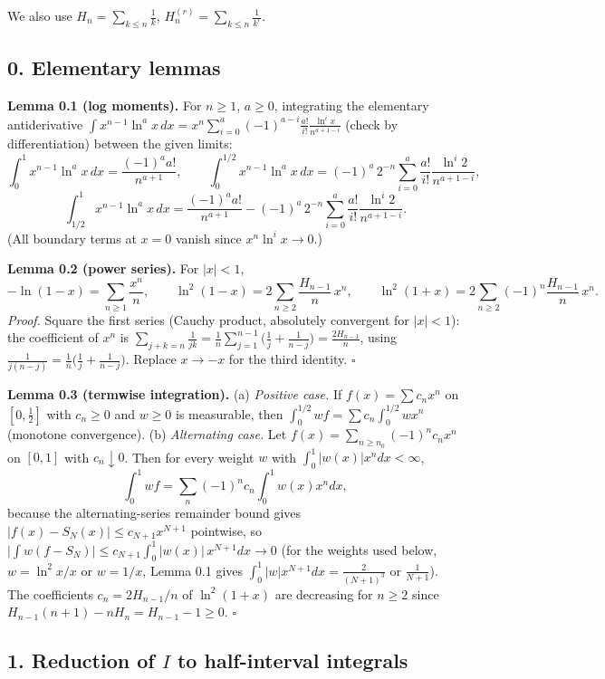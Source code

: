\documentclass[11pt]{article}
\theoremstyle{remark}
\begin{document}
We also use $H_n=\sum_{k\le n}\frac1k$, $H_n^{(r)}=\sum_{k\le n}\frac1{k^r}$.

\subsection*{0. Elementary lemmas}

\textbf{Lemma 0.1 (log moments).} For $n\ge1$, $a\ge0$, integrating the elementary antiderivative
$\int x^{n-1}\ln^a x\,dx=x^{n}\sum_{i=0}^{a}(-1)^{a-i}\frac{a!}{i!}\frac{\ln^i x}{n^{a+1-i}}$ (check by
differentiation) between the given limits:
\[
\int_0^1 x^{n-1}\ln^a x\,dx=\frac{(-1)^a a!}{n^{a+1}},\qquad
\int_0^{1/2}x^{n-1}\ln^a x\,dx=(-1)^a\,2^{-n}\sum_{i=0}^{a}\frac{a!}{i!}\frac{\ln^i 2}{n^{a+1-i}},
\]
\[
\int_{1/2}^{1}x^{n-1}\ln^a x\,dx=\frac{(-1)^a a!}{n^{a+1}}
-(-1)^a\,2^{-n}\sum_{i=0}^{a}\frac{a!}{i!}\frac{\ln^i 2}{n^{a+1-i}} .
\]
(All boundary terms at $x=0$ vanish since $x^n\ln^ix\to0$.)

\textbf{Lemma 0.2 (power series).} For $|x|<1$,
\[
-\ln(1-x)=\sum_{n\ge1}\frac{x^n}{n},\qquad
\ln^2(1-x)=2\sum_{n\ge2}\frac{H_{n-1}}{n}\,x^{n},\qquad
\ln^2(1+x)=2\sum_{n\ge2}(-1)^n\frac{H_{n-1}}{n}\,x^{n}.
\]
\textit{Proof.} Square the first series (Cauchy product, absolutely convergent for $|x|<1$):
the coefficient of $x^n$ is $\sum_{j+k=n}\frac{1}{jk}=\frac1n\sum_{j=1}^{n-1}\Big(\frac1j+\frac1{n-j}\Big)
=\frac{2H_{n-1}}{n}$, using $\frac{1}{j(n-j)}=\frac1n\big(\frac1j+\frac1{n-j}\big)$. Replace $x\to-x$
for the third identity. $\square$

\textbf{Lemma 0.3 (termwise integration).}
(a) \textit{Positive case.} If $f(x)=\sum c_nx^n$ on $[0,\tfrac12]$ with $c_n\ge0$ and $w\ge0$ is measurable,
then $\int_0^{1/2}wf=\sum c_n\int_0^{1/2}wx^n$ (monotone convergence).
(b) \textit{Alternating case.} Let $f(x)=\sum_{n\ge n_0}(-1)^n c_n x^n$ on $[0,1]$ with $c_n\downarrow 0$.
Then for every weight $w$ with $\int_0^1|w(x)|x^{n}dx<\infty$,
\[
\int_0^1 w f=\sum_{n}(-1)^nc_n\int_0^1 w(x)x^n dx,
\]
because the alternating-series remainder bound gives $|f(x)-S_N(x)|\le c_{N+1}x^{N+1}$ pointwise, so
$\big|\int w(f-S_N)\big|\le c_{N+1}\int_0^1 |w(x)|\,x^{N+1}dx\to0$ (for the weights used below,
$w=\ln^2x/x$ or $w=1/x$, Lemma 0.1 gives $\int_0^1|w|x^{N+1}dx = \tfrac{2}{(N+1)^3}$ or
$\tfrac{1}{N+1}$).
The coefficients $c_n=2H_{n-1}/n$ of $\ln^2(1+x)$ are decreasing for $n\ge2$ since
$H_{n-1}(n+1)-nH_n=H_{n-1}-1\ge0$. $\square$

\subsection*{1. Reduction of $I$ to half-interval integrals}
\end{document}
